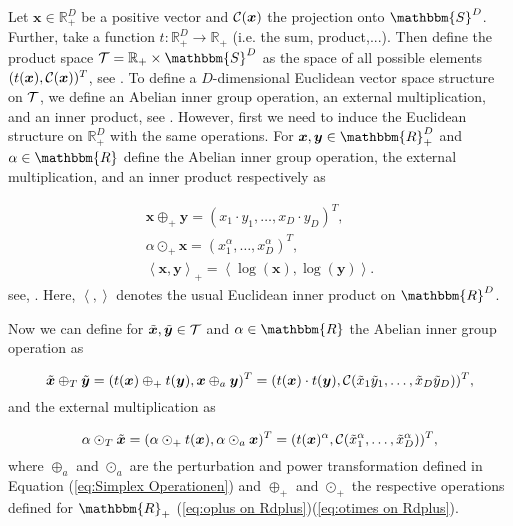 Let $\bm{x} \in \mathbb{R}^D_+$ be a positive vector and $\mathcal{C}(\bm{x})$ the projection onto $\mathbbm{S}^D$. Further, take a function $t:\mathbb{R}^D_+ \longrightarrow \mathbb{R}_+$ (i.e. the sum, product,...). Then define the product space  $\Tsp = \mathbb{R}_+ \times \mathbbm{S}^D$ as the space of all possible elements $(t(\bm{x}),\mathcal{C}(\bm{x}))^T$, see \textcite{Pawlowsky:2013}. To define a $D$-dimensional Euclidean vector space structure on $\mathcal{T}$, we define an Abelian inner group operation, an external multiplication, and an inner product, see \textcite{Pawlowsky:2013}. However, first we need to induce the Euclidean structure on $\mathbb{R}_+^D$ with the same operations. For $\bm{x},\bm{y} \in \mathbbm{R}_+^D$ and $\alpha \in \mathbbm{R}$ define the Abelian inner group operation, the external multiplication, and an inner product respectively as 

\begin{gather}
\bm{x} \oplus_+ \bm{y}= (x_1\cdot y_1,\ldots,x_D \cdot y_D)^T, \label{eq:oplus on Rdplus} \\
\alpha \odot_+ \bm{x} = (x_1^{\alpha},\ldots,x_D^{\alpha})^T, \label{eq:otimes on Rdplus} \\
\left\langle \bm{x},\bm{y} \right\rangle_+ = \left\langle \log(\bm{x}),\log(\bm{y}) \right\rangle.
\label{eq:innerproduct on Rdplus}
\end{gather}
%
see, \textcite{Pawlowsky:2013}. Here, $\left\langle ,\right\rangle$ denotes the usual Euclidean inner product on $\mathbbm{R}^D$. 

Now we can define for $\tilde{\bm{x}},\tilde{\bm{y}} \in \mathcal{T}$ and $\alpha \in \mathbbm{R}$ the Abelian inner group operation as 

\begin{equation}
\tilde{\bm{x}} \oplus_T \tilde{\bm{y}} = (t(\bm{x}) \oplus_+ t(\bm{y}), \bm{x} \oplus_a \bm{y})^T = (t(\bm{x}) \cdot t(\bm{y}), \mathcal{C}(\tilde{x}_1\tilde{y}_1,\ldots,\tilde{x}_D\tilde{y}_D))^T,
\label{eq:Abelian inner group operation}
\end{equation}
%
and the external multiplication as 

\begin{equation}
\alpha \odot_T \tilde{\bm{x}} = (\alpha \odot_+ t(\bm{x}), \alpha \odot_a \bm{x})^T = (t(\bm{x})^{\alpha},\mathcal{C}(\tilde{x}_1^{\alpha},\ldots,\tilde{x}_D^{\alpha}))^T,
\label{eq:external multiplication}
\end{equation}
%
where $\oplus_a$ and $\odot_a$ are the perturbation and power transformation defined in Equation (\ref{eq:Simplex Operationen}) and $\oplus_+$ and $\odot_+$ the respective operations defined for $\mathbbm{R}_+$ (\ref{eq:oplus on Rdplus})(\ref{eq:otimes on Rdplus}).

